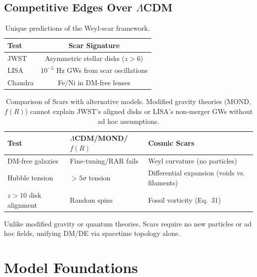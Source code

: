 \documentclass{article}
\begin{document}
\subsection{Competitive Edges Over $\Lambda$CDM}
\begin{table}[H]
    \centering
    \begin{tabular}{lc}
        \hline
        \textbf{Test} & \textbf{Scar Signature} \\
        \hline
        JWST & Asymmetric stellar disks ($z > 6$) \\
        LISA & $10^{-5}$ Hz GWs from scar oscillations \\
        Chandra & Fe/Ni in DM-free lenses \\
        \hline
    \end{tabular}
    \caption{Unique predictions of the Weyl-scar framework.}
    \label{tab:signatures}
\end{table}


\begin{table}[H]
    \centering
    \begin{tabularx}{\textwidth}{l>{\raggedright\arraybackslash}X>{\raggedright\arraybackslash}X}
        \hline
        \textbf{Test} & \textbf{$\Lambda$CDM/MOND/$f(R)$} & \textbf{Cosmic Scars} \\  %
        \hline
        DM-free galaxies & Fine-tuning/RAR fails & Weyl curvature (no particles) \\
        Hubble tension & $>5\sigma$ tension & Differential expansion (voids vs. filaments) \\
        $z>10$ disk alignment & Random spins & Fossil vorticity (Eq.~31) \\
        \hline
    \end{tabularx}
    \caption{Comparison of Scars with alternative models. Modified gravity theories (MOND, $f(R)$) cannot explain JWST's aligned disks or LISA's non-merger GWs without ad hoc assumptions.}
    \label{tab:comparison}
\end{table}

Unlike modified gravity or quantum theories, Scars require no new particles or ad hoc fields, unifying DM/DE via spacetime topology alone.


\section{Model Foundations}
\end{document}
